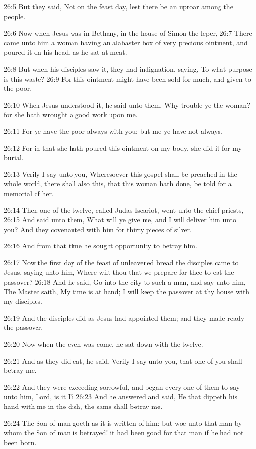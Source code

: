 26:5 But they said, Not on the feast day, lest there be an uproar among the people.

26:6 Now when Jesus was in Bethany, in the house of Simon the leper, 26:7 There came unto him a woman having an alabaster box of very precious ointment, and poured it on his head, as he sat at meat.

26:8 But when his disciples saw it, they had indignation, saying, To what purpose is this waste?  26:9 For this ointment might have been sold for much, and given to the poor.

26:10 When Jesus understood it, he said unto them, Why trouble ye the woman? for she hath wrought a good work upon me.

26:11 For ye have the poor always with you; but me ye have not always.

26:12 For in that she hath poured this ointment on my body, she did it for my burial.

26:13 Verily I say unto you, Wheresoever this gospel shall be preached in the whole world, there shall also this, that this woman hath done, be told for a memorial of her.

26:14 Then one of the twelve, called Judas Iscariot, went unto the chief priests, 26:15 And said unto them, What will ye give me, and I will deliver him unto you? And they covenanted with him for thirty pieces of silver.

26:16 And from that time he sought opportunity to betray him.

26:17 Now the first day of the feast of unleavened bread the disciples came to Jesus, saying unto him, Where wilt thou that we prepare for thee to eat the passover?  26:18 And he said, Go into the city to such a man, and say unto him, The Master saith, My time is at hand; I will keep the passover at thy house with my disciples.

26:19 And the disciples did as Jesus had appointed them; and they made ready the passover.

26:20 Now when the even was come, he sat down with the twelve.

26:21 And as they did eat, he said, Verily I say unto you, that one of you shall betray me.

26:22 And they were exceeding sorrowful, and began every one of them to say unto him, Lord, is it I?  26:23 And he answered and said, He that dippeth his hand with me in the dish, the same shall betray me.

26:24 The Son of man goeth as it is written of him: but woe unto that man by whom the Son of man is betrayed! it had been good for that man if he had not been born.

